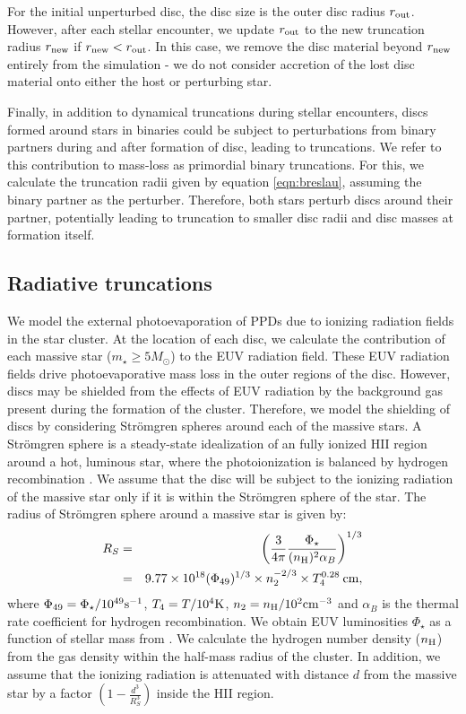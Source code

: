 \documentclass[fleqn,usenatbib]{mnras}
\begin{document}
For the initial unperturbed disc, the disc size is the outer disc radius $r_{\rm out}$. However, after each stellar encounter, we update $r_{\rm out}$ to the new truncation radius $r_{\rm new}$ if $r_{\rm new} < r_{\rm out}$. In this case, we remove the disc material beyond $r_{\rm new}$ entirely from the simulation - we do not consider accretion of the lost disc material onto either the host or perturbing star. 

Finally, in addition to dynamical truncations during stellar encounters, discs formed around stars in binaries could be subject to perturbations from binary partners during and after formation of disc, leading to truncations. We refer to this contribution to mass-loss as primordial binary truncations. For this, we calculate the truncation radii given by equation \ref{eqn:breslau}, assuming the binary partner as the perturber. Therefore, both stars perturb discs around their partner, potentially leading to truncation to smaller disc radii and disc masses at formation itself.   

\subsection{Radiative truncations}
\label{subsec:radiativefeedback}

We model the external photoevaporation of PPDs due to ionizing radiation fields in the star cluster. At the location of each disc, we calculate the contribution of each massive star ($m_{\star} \geq 5 M_\odot$) to the EUV radiation field. These EUV radiation fields drive photoevaporative mass loss in the outer regions of the disc. However, discs may be shielded from the effects of EUV radiation by the background gas present during the formation of the cluster. Therefore, we model the shielding of discs by considering Str\"omgren spheres around each of the massive stars. A Str\"omgren sphere is a steady-state idealization of an fully ionized HII region around a hot, luminous star, where the photoionization is balanced by hydrogen recombination \citep[e.g.,][]{draine2010physics}. We assume that the disc will be subject to the ionizing radiation of the massive star only if it is within the Str\"omgren sphere of the star. The radius of Str\"omgren sphere around a massive star is given by:
\begin{eqnarray}
    R_S &=& \left( \frac{3}{4\pi} \frac{\Phi_\star}{(n_{\rm H})^2 \alpha_B} \right)^{1/3} \nonumber \\
        &=& 9.77 \times 10^{18} (\Phi_{49})^{1/3} \times n_2^{-2/3} \times T_4^{0.28} \:{\rm cm},
    \label{eqn:Stromgrenradius}
\end{eqnarray}
where $\Phi_{49} = \Phi_\star/10^{49} {\rm s}^{-1}$, $T_4 = T/10^4 {\rm K}$, $n_2=n_{\rm H}/10^2  {\rm cm}^{-3}$ and $\alpha_B$ is the thermal rate coefficient for hydrogen recombination. We obtain EUV luminosities $\Phi_\star$ as a function of stellar mass from \cite{Armitage2000A&A...362..968A}. We calculate the hydrogen number density ($n_{\rm H}$) from the gas density within the half-mass radius of the cluster. In addition, we assume that the ionizing radiation is attenuated with distance $d$ from the massive star by a factor $\left( 1-\frac{d^3}{R_S^3} \right)$ inside the HII region. 
\end{document}
